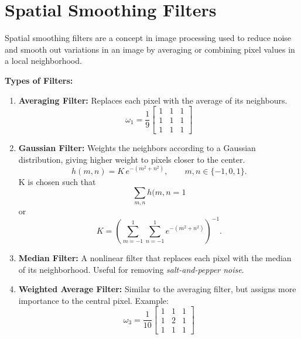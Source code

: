 \section{Spatial Smoothing Filters}
Spatial smoothing filters are a concept in image processing used to reduce noise 
and smooth out variations in an image by averaging or combining pixel values 
in a local neighborhood.

\vspace{4pt}
\textbf{Types of Filters:}
\begin{enumerate}
    \item \textbf{Averaging Filter:} Replaces each pixel with the average of its neighbours.  
    \[
    \omega_1 = \frac{1}{9}
    \begin{bmatrix}
        1 & 1 & 1 \\
        1 & 1 & 1 \\
        1 & 1 & 1
    \end{bmatrix}
    \]

    \item \textbf{Gaussian Filter:} Weights the neighbors according to a Gaussian distribution, 
    giving higher weight to pixels closer to the center.  
    \[
    h(m,n) = K\, e^{-(m^2+n^2)}, \qquad m,n \in \{-1,0,1\}.
    \]
    K is chosen such that 
    \[
    \sum_{m,n}{h(m,n} = 1
    \]
    or
    \[
K=\left(\sum_{m=-1}^{1}\sum_{n=-1}^{1} e^{-(m^2+n^2)}\right)^{-1}.
\]
    
    \item \textbf{Median Filter:} A nonlinear filter that replaces each pixel 
    with the median of its neighborhood.  
    Useful for removing \emph{salt-and-pepper noise}.

    \item \textbf{Weighted Average Filter:} Similar to the averaging filter, 
    but assigns more importance to the central pixel.  
    Example:  
    \[
    \omega_3 = \frac{1}{10}
    \begin{bmatrix}
        1 & 1 & 1 \\
        1 & 2 & 1 \\
        1 & 1 & 1
    \end{bmatrix}
    \]
\end{enumerate}

